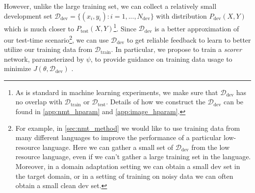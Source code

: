 However, unlike the large training set, we can collect a relatively small development set $\mathcal{D}_\text{dev}= \{(x_i, y_i): i = 1, ..., N_\text{dev}\}$ with distribution $P_{\text{dev}}(X, Y)$ which is much closer to $P_{\text{test}}(X, Y)$\footnote{As is standard in machine learning experiments, we make sure that $\mathcal{D}_\text{dev}$ has no overlap with $\mathcal{D}_\text{train}$ or $\mathcal{D}_\text{test}$. Details of how we construct the $\mathcal{D}_\text{dev}$ can be found in \autoref{app:nmt_hparam} and \autoref{app:image_hparam}.}.
Since $\mathcal{D}_\text{dev}$ is a better approximation of our test-time scenario\footnote{For example, in \autoref{sec:nmt_method} we would like to use training data from many different languages to improve the performance of a particular low-resource language. Here we can gather a small set of $\mathcal{D}_\text{dev}$ from the low resource language, even if we can’t gather a large training set in the language. Moreover, in a domain adaptation setting we can obtain a small dev set in the target domain, or in a setting of training on noisy data we can often obtain a small clean dev set.}, we can use $\mathcal{D}_\text{dev}$ to get reliable feedback to learn to better utilize our training data from $\mathcal{D}_\text{train}$. In particular, we propose to train a \emph{scorer} network, parameterized by $\psi$, to provide guidance on training data usage to minimize $J(\theta, \mathcal{D}_\text{dev})$ .



